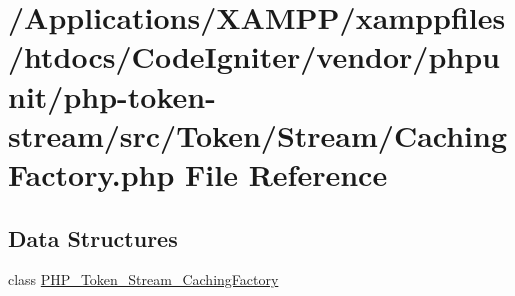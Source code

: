\hypertarget{_caching_factory_8php}{}\section{/\+Applications/\+X\+A\+M\+P\+P/xamppfiles/htdocs/\+Code\+Igniter/vendor/phpunit/php-\/token-\/stream/src/\+Token/\+Stream/\+Caching\+Factory.php File Reference}
\label{_caching_factory_8php}
\subsection*{Data Structures}
\begin{DoxyCompactItemize}
\item 
class \mbox{\hyperlink{class_p_h_p___token___stream___caching_factory}{P\+H\+P\+\_\+\+Token\+\_\+\+Stream\+\_\+\+Caching\+Factory}}
\end{DoxyCompactItemize}
